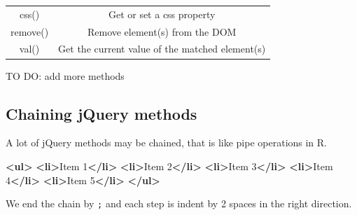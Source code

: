 \documentclass[
]{book}
\newenvironment{Shaded}{\begin{snugshade}}{\end{snugshade}}
\newcommand{\AttributeTok}[1]{\textcolor[rgb]{0.77,0.63,0.00}{#1}}
\newcommand{\CommentTok}[1]{\textcolor[rgb]{0.56,0.35,0.01}{\textit{#1}}}
\newcommand{\KeywordTok}[1]{\textcolor[rgb]{0.13,0.29,0.53}{\textbf{#1}}}
\newcommand{\NormalTok}[1]{#1}
\newcommand{\OperatorTok}[1]{\textcolor[rgb]{0.81,0.36,0.00}{\textbf{#1}}}
\newcommand{\StringTok}[1]{\textcolor[rgb]{0.31,0.60,0.02}{#1}}
\begin{document}
\begin{longtable}[]{@{}cc@{}}
\begin{minipage}[t]{0.42\columnwidth}\centering
css()\strut
\end{minipage} & \begin{minipage}[t]{0.52\columnwidth}\centering
Get or set a css property\strut
\end{minipage}\tabularnewline
\begin{minipage}[t]{0.42\columnwidth}\centering
remove()\strut
\end{minipage} & \begin{minipage}[t]{0.52\columnwidth}\centering
Remove element(s) from the DOM\strut
\end{minipage}\tabularnewline
\begin{minipage}[t]{0.42\columnwidth}\centering
val()\strut
\end{minipage} & \begin{minipage}[t]{0.52\columnwidth}\centering
Get the current value of the matched element(s)\strut
\end{minipage}\tabularnewline
\bottomrule
\end{longtable}

TO DO: add more methods

\hypertarget{chaining-jquery-methods}{%
\subsection{Chaining jQuery methods}\label{chaining-jquery-methods}}

A lot of jQuery methods may be chained, that is like pipe operations in R.

\begin{Shaded}
\begin{Highlighting}[]
\KeywordTok{<ul>}
  \KeywordTok{<li>}\NormalTok{Item 1}\KeywordTok{</li>}
  \KeywordTok{<li>}\NormalTok{Item 2}\KeywordTok{</li>}
  \KeywordTok{<li>}\NormalTok{Item 3}\KeywordTok{</li>}
  \KeywordTok{<li>}\NormalTok{Item 4}\KeywordTok{</li>}
  \KeywordTok{<li>}\NormalTok{Item 5}\KeywordTok{</li>}
\KeywordTok{</ul>}
\end{Highlighting}
\end{Shaded}

We end the chain by \texttt{;} and each step is indent by 2 spaces in the right direction.

\begin{Shaded}
\end{Shaded}
\end{document}
